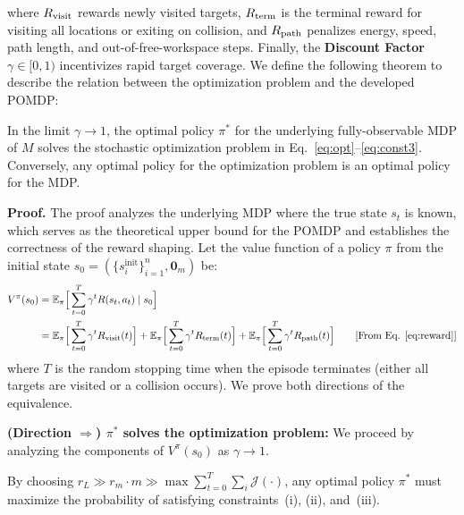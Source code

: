 \documentclass{article}
\begin{document}
where $R_{\mathrm{visit}}$ rewards newly visited targets, $R_{\mathrm{term}}$ is the terminal reward for visiting all locations or exiting on collision, and $R_{\mathrm{path}}$ penalizes energy, speed, path length, and out-of-free-workspace steps. Finally, the \textbf{Discount Factor} $\gamma \in [0,1)$ incentivizes rapid target coverage. We define the following theorem to describe the relation between the optimization problem and the developed POMDP:

\begin{theorem}
\label{thm:optimization}
In the limit $\gamma \to 1$, the optimal policy $\pi^*$ for the underlying fully-observable MDP of $M$ solves the stochastic optimization problem in Eq.~\eqref{eq:opt}--\eqref{eq:const3}. Conversely, any optimal policy for the optimization problem is an optimal policy for the MDP.
\end{theorem}

\textbf{Proof.} The proof analyzes the underlying MDP where the true state $s_t$ is known, which serves as the theoretical upper bound for the POMDP and establishes the correctness of the reward shaping. Let the value function of a policy $\pi$ from the initial state $s_0 = (\{s_i^{\mathrm{init}}\}_{i=1}^n, \mathbf{0}_m)$ be:
\begin{align}
    V^\pi(s_0) &= \mathbb{E}_\pi \Big[\sum_{t=0}^T \gamma^t R(s_t, a_t) \mid s_0 \Big] \label{eq:opt_policy} \\
    &= \mathbb{E}_\pi \Big[ \sum_{t=0}^T \gamma^t \rvisit(t) \Big] + \mathbb{E}_\pi \Big[ \sum_{t=0}^T \gamma^t \rterm(t) \Big] + \mathbb{E}_\pi \Big[ \sum_{t=0}^T \gamma^t \rpath(t) \Big] \tag*{[From Eq. \eqref{eq:reward}]}
\end{align}
where $T$ is the random stopping time when the episode terminates (either all targets are visited or a collision occurs). We prove both directions of the equivalence.

\textbf{(Direction $\Rightarrow$) $\pi^*$ solves the optimization problem:}
We proceed by analyzing the components of $V^\pi(s_0)$ as $\gamma \to 1$.

\begin{lemma}
\label{lem:const}
By choosing $r_L \gg r_m \cdot m \gg \max \sum_{t=0}^T \sum_i \mathcal{J}(\cdot)$, any optimal policy $\pi^*$ must maximize the probability of satisfying constraints~\textnormal{(i)}, \textnormal{(ii)}, and~\textnormal{(iii)}.
\end{lemma}
\end{document}

